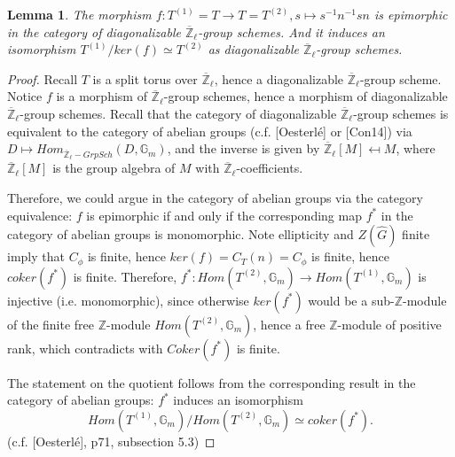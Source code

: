 \documentclass{article}
\newtheorem{lemma}{Lemma}
\begin{document}
	\begin{lemma}
		The morphism
		$f: T^{(1)}=T \to T=T^{(2)}, s \mapsto s^{-1}n^{-1}sn$
		is epimorphic in the category of diagonalizable $\overline{\mathbb{Z}}_{\ell}$-group schemes. And it induces an isomorphism $T^{(1)}/ker(f) \simeq T^{(2)}$ as diagonalizable $\overline{\mathbb{Z}}_{\ell}$-group schemes.
	\end{lemma}
	
	\begin{proof}
		Recall $T$ is a split torus over $\overline{\mathbb{Z}}_{\ell}$, hence a diagonalizable $\overline{\mathbb{Z}}_{\ell}$-group scheme. Notice $f$ is a morphism of $\overline{\mathbb{Z}}_{\ell}$-group schemes, hence a morphism of diagonalizable $\overline{\mathbb{Z}}_{\ell}$-group schemes. Recall that the category of diagonalizable $\overline{\mathbb{Z}}_{\ell}$-group schemes is equivalent to the category of abelian groups (c.f. [Oesterlé] or [Con14]) via $D \mapsto Hom_{\overline{\mathbb{Z}}_{\ell}-Grp Sch}(D, \mathbb{G}_m)$, and the inverse is given by $\overline{\mathbb{Z}}_{\ell}[M] \mapsfrom M$, where $\overline{\mathbb{Z}}_{\ell}[M]$ is the group algebra of $M$ with $\overline{\mathbb{Z}}_{\ell}$-coefficients. 
		
		Therefore, we could argue in the category of abelian groups via the category equivalence: $f$ is epimorphic if and only if the corresponding map $f^*$ in the category of abelian groups is monomorphic. Note ellipticity and $Z(\hat{G})$ finite imply that $C_{\phi}$ is finite, hence $ker(f)=C_T(n)=C_{\phi}$ is finite, hence $coker(f^*)$ is finite. Therefore, $f^*: Hom(T^{(2)}, \mathbb{G}_m) \to Hom(T^{(1)}, \mathbb{G}_m)$ is injective (i.e. monomorphic), since otherwise $ker(f^*)$ would be a sub-$\mathbb{Z}$-module of the finite free $\mathbb{Z}$-module $Hom(T^{(2)}, \mathbb{G}_m)$, hence a free $\mathbb{Z}$-module of positive rank, which contradicts with $Coker(f^*)$ is finite.
		
		The statement on the quotient follows from the corresponding result in the category of abelian groups: $f^*$ induces an isomorphism 
		$$Hom(T^{(1)}, \mathbb{G}_m)/Hom(T^{(2)}, \mathbb{G}_m) \simeq coker(f^*).$$ (c.f. [Oesterlé], p71, subsection 5.3)
		
		

\end{proof}
\end{document}
